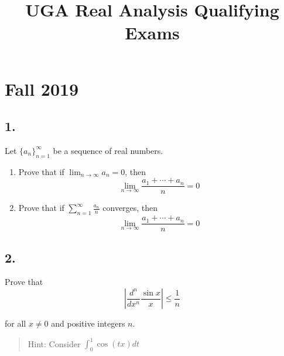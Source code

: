 


\usepackage{environ}
\let\proof\killcontents
\let\endproof\endkillcontents

\title{UGA Real Analysis Qualifying Exams}
\date{}


\maketitle
\tableofcontents 
\newpage

\hypertarget{fall-2019}{%
\section{Fall 2019}\label{fall-2019}}

\hypertarget{section}{%
\subsection{1.}\label{section}}

Let \(\{a_n\}_{n=1}^\infty\) be a sequence of real numbers.

\begin{enumerate}
\def\labelenumi{\alph{enumi}.}
\item
  Prove that if \(\displaystyle\lim_{n\to\infty} a_n = 0\), then
  \[
  \lim _{n \rightarrow \infty} \frac{a_{1}+\cdots+a_{n}}{n}=0
  \]
\item
  Prove that if \(\displaystyle\sum_{n=1}^{\infty} \frac{a_{n}}{n}\)
  converges, then \[
  \lim _{n \rightarrow \infty} \frac{a_{1}+\cdots+a_{n}}{n}=0
  \]
\end{enumerate}

\begin{proof}

\end{proof}

\hypertarget{section-1}{%
\subsection{2.}\label{section-1}}

Prove that \[
\left|\frac{d^{n}}{d x^{n}} \frac{\sin x}{x}\right| \leq \frac{1}{n}
\]

for all \(x \neq 0\) and positive integers \(n\).

\begin{quote}
Hint: Consider \(\displaystyle\int_0^1 \cos(tx) dt\)
\end{quote}

